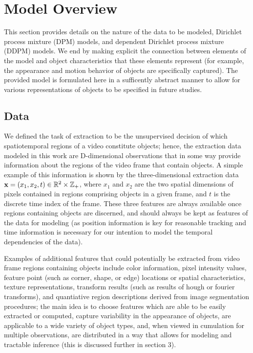 \documentclass{article}
\begin{document}
\section{Model Overview}
\label{sec:modeloverview}
%
This section provides details on the nature of the data to be modeled, Dirichlet process mixture (DPM) models, and dependent Dirichlet process mixture (DDPM) models. We end by making explicit the connection between elements of the model and object characteristics that these elements represent (for example, the appearance and motion behavior of objects are specifically captured). The provided model is formulated here in a sufficently abstract manner to allow for various representations of objects to be specified in future studies.




\subsection{Data}
\label{sec:data}
%
We defined the task of extraction to be the unsupervised decision of which spatiotemporal regions of a video constitute objects; hence, the extraction data modeled in this work are D-dimensional observations that in some way provide information about the regions of the video frame that contain objects. A simple example of this information is shown by the three-dimensional extraction data $\bold{x} = ( x_{1}, x_{2}, t ) \in \mathbb{R}^{2} \times \mathbb{Z}_{+}$, where $x_{1}$ and $x_{2}$ are the two spatial dimensions of pixels contained in regions comprising objects in a given frame, and $t$ is the discrete time index of the frame. These three features are always available once regions containing objects are discerned, and should always be kept as features of the data for modeling (as position information is key for reasonable tracking and time information is necessary for our intention to model the temporal dependencies of the data).

Examples of additional features that could potentially be extracted from video frame regions containing objects include color information, pixel intensity values, feature point (such as corner, shape, or edge) locations or spatial characteristics, texture representations, transform results (such as results of hough or fourier transforms), and quantiative region descriptions derived from image segmentation procedures; the main idea is to choose features which are able to be easily extracted or computed, capture variability in the appearance of objects, are applicable to a wide variety of object types, and, when viewed in cumulation for multiple observations, are distributed in a way that allows for modeling and tractable inference (this is discussed further in section 3).
\end{document}
